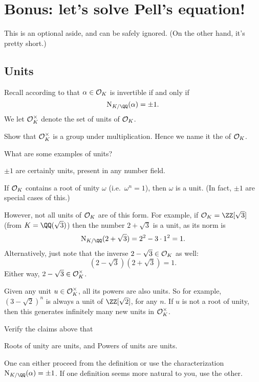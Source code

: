 \chapter{Bonus: let's solve Pell's equation!}
This is an optional aside, and can be safely ignored.
(On the other hand, it's pretty short.)

\section{Units}
Recall according to  that $\alpha \in \mathcal O_K$ is invertible
if and only if \[ \NK(\alpha) = \pm 1. \]
We let $\mathcal O_K^\times$ denote the set of units of $\mathcal O_K$.

\begin{ques}
	Show that $\mathcal O_K^\times$ is a group under multiplication.
	Hence we name it the  of $\mathcal O_K$.
\end{ques}

What are some examples of units?
\begin{example}
	\listhack
	\begin{enumerate}
		\ii $\pm 1$ are certainly units, present in any number field.

		\ii If $\mathcal O_K$ contains a root of unity $\omega$ (i.e.\ $\omega^n=1$),
		then $\omega$ is a unit.
		(In fact, $\pm 1$ are special cases of this.)

		\ii However, not all units of $\mathcal O_K$ are of this form.
		For example, if $\OO_K = \ZZ[\sqrt3]$ (from $K = \QQ(\sqrt3)$) then
		the number $2+\sqrt3$ is a unit, as its norm is
		\[ \NK(2+\sqrt3) = 2^2 - 3 \cdot 1^2 = 1. \]
		Alternatively, just note that the inverse $2-\sqrt3 \in \mathcal O_K$ as well:
		\[ \left( 2-\sqrt3 \right)\left( 2+\sqrt3 \right) = 1. \]
		Either way, $2-\sqrt3 \in \mathcal O_K^\times$.

		\ii Given any unit $u \in \mathcal O_K^\times$, all its powers are also units.
		So for example, $(3-\sqrt2)^n$ is always a unit of $\ZZ[\sqrt2]$, for any $n$.
		If $u$ is not a root of unity, then this generates infinitely many new units in $\mathcal O_K^\times$.
	\end{enumerate}
\end{example}

\begin{ques}
	Verify the claims above that
	\begin{enumerate}[(a)]
		\ii Roots of unity are units, and
		\ii Powers of units are units.
	\end{enumerate}
	One can either proceed from the definition
	or use the characterization $\NK(\alpha) = \pm 1$.
	If one definition seems more natural to you, use the other.
\end{ques}

